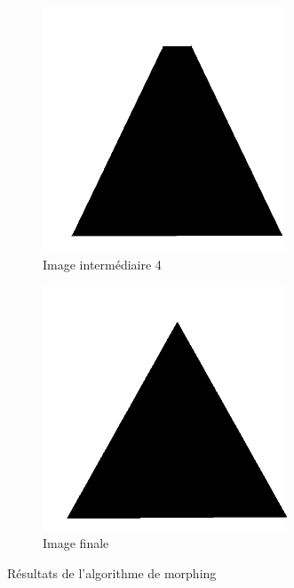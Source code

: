 \begin{figure}[h!]
        \begin{subfigure}{0.4\textwidth}
            \centering
            \includegraphics[width=0.8\textwidth]{img/p1/5.png}
            \caption{Image intermédiaire 4}
        \end{subfigure}
        \begin{subfigure}{0.4\textwidth}
            \centering
            \includegraphics[width=0.8\textwidth]{img/p1/6.png}
            \caption{Image finale}
        \end{subfigure}
        \caption{Résultats de l'algorithme de morphing}
\end{figure}

